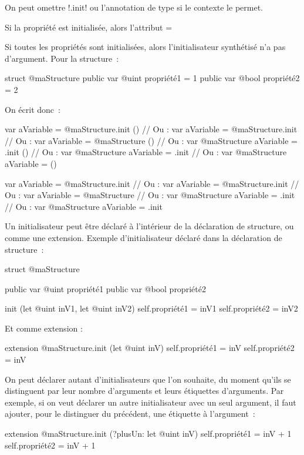 On peut omettre \ggsq!.init! ou l'annotation de type si le contexte le permet.

Si la propriété est initialisée, alors l'attribut \ggsq=%


Si toutes les propriétés sont initialisées, alors l'initialisateur synthétisé n'a pas d'argument. Pour la structure~:
\begin{galgas34}
struct @maStructure {
  public var @uint propriété1 = 1
  public var @bool propriété2 = 2
}
\end{galgas34}

On écrit donc~:
\begin{galgas34}
var aVariable = @maStructure.init ()
// Ou :
var aVariable = @maStructure.init
// Ou :
var aVariable = @maStructure ()
// Ou :
var @maStructure aVariable = .init ()
// Ou :
var @maStructure aVariable = .init
// Ou :
var @maStructure aVariable = ()
\end{galgas34}
\begin{galgas3}
var aVariable = @maStructure.init {}
// Ou :
var aVariable = @maStructure.init
// Ou :
var aVariable = @maStructure {}
// Ou :
var @maStructure aVariable = .init {}
// Ou :
var @maStructure aVariable = .init
\end{galgas3}








Un initialisateur peut être déclaré à l'intérieur de la déclaration de structure, ou comme une extension. Exemple d'initialisateur déclaré dans la déclaration de structure~:

\begin{galgas34}
struct @maStructure {
  public var @uint propriété1
  public var @bool propriété2
  
  init (let @uint inV1, let @uint inV2) {
    self.propriété1 = inV1
    self.propriété2 = inV2
  }
}
\end{galgas34}

Et comme extension :

\begin{galgas34}
extension @maStructure.init (let @uint inV) {
  self.propriété1 = inV
  self.propriété2 = inV
}
\end{galgas34}

On peut déclarer autant d'initialisateurs que l'on souhaite, du moment qu'ils se distinguent par leur nombre d'arguments et leurs étiquettes d'arguments. Par exemple, si on veut déclarer un autre initialisateur avec un seul argument, il faut ajouter, pour le distinguer du précédent, une étiquette à l'argument~:
\begin{galgas34}
extension @maStructure.init (?plusUn: let @uint inV) {
  self.propriété1 = inV + 1
  self.propriété2 = inV + 1
}
\end{galgas34}

